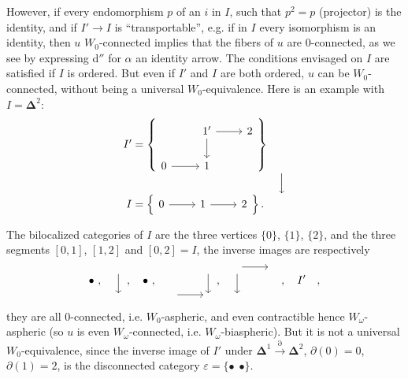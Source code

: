 \documentclass[11pt]{article}
\newcommand{\printedpage}[1]{\marginpar{\footnotesize p.~#1}}
\newcommand{\msp}[1]{\marginpar{\footnotesize [#1]}}
\newcommand{\bDelta}{\boldsymbol{\Delta}}
\begin{document}
However, if every endomorphism $p$ of an $i$ in $I$, such that $p^2 = p$ (projector) is the identity, and if \msp{page 57}$I' \longrightarrow I$ is ``transportable'', e.g. if in $I$ every isomorphism is an identity, then $u$ $W_0$-connected implies that the fibers of $u$ are 0-connected, as we see by expressing d$''$ for $\alpha$ an identity arrow. The conditions envisaged on $I$ are satisfied if $I$ is ordered. But even if $I'$ and $I$ are both ordered, $u$ can be $W_0$-connected, without being a universal $W_0$-equivalence. Here is an example with $I = \bDelta^2$:
\[
\begin{array}{r@{\;}l@{\quad}c}
I' = & \left\{\begin{tikzcd}[ampersand replacement=\&]
 \& 1' \arrow[r] \arrow[d] \& 2 \\
0 \arrow[r] \& 1 \&
\end{tikzcd}\right\} & \\[1ex]
 & & \Big\downarrow \\[1ex]
I = & \left\{\begin{tikzcd}[ampersand replacement=\&]
0 \arrow[r] \& 1 \arrow[r] \& 2
\end{tikzcd}\right\}. &
\end{array}
\]

\printedpage{36}
The bilocalized categories of $I$ are the three vertices $\{0\}$, $\{1\}$, $\{2\}$, and the three segments $[0,1]$, $[1,2]$ and $[0,2] = I$, the inverse images are respectively
\[
\bullet\ ,\quad
\begin{tikzcd}[row sep=normal] {} \arrow[d] \\ {} \end{tikzcd}\ ,\quad
\bullet\ ,\quad
\begin{tikzcd}[row sep=normal] & {} \arrow[d] \\ {} \arrow[r] & {} \end{tikzcd}\ ,\quad
\begin{tikzcd}[row sep=normal] {} \arrow[r] \arrow[d] & {} \\ {} & \end{tikzcd}\ ,\quad
I'\quad ,
\]
they are all 0-connected, i.e. $W_0$-aspheric, and even contractible hence $W_\omega$-aspheric (so $u$ is even $W_\omega$-connected, i.e. $W_\omega$-biaspheric). But it is not a universal $W_0$-equivalence, since the inverse image of $I'$ under $\bDelta^1 \xrightarrow{\partial} \bDelta^2$, $\partial(0) = 0$, $\partial(1) = 2$, \msp{page 58}is the disconnected category $\varepsilon = \{\bullet\ \ \bullet\}$.
\end{document}
